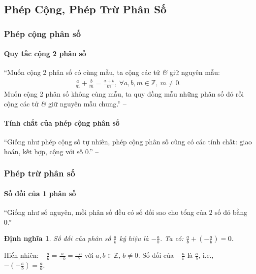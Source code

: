 \documentclass{article}
\numberwithin{equation}{section}
\newtheorem{dinhnghia}{Định nghĩa}[section]
\begin{document}

\subsection{Phép Cộng, Phép Trừ Phân Số}

\subsubsection{Phép cộng phân số}

\paragraph{Quy tắc cộng 2 phân số}
``Muốn cộng 2 phân số có cùng mẫu, ta cộng các tử \textit{\&} giữ nguyên mẫu:
\begin{align*}
	\frac{a}{m} + \frac{b}{m} = \frac{a + b}{m},\ \forall a,b,m\in\mathbb{Z},\ m\ne 0.
\end{align*}
Muốn cộng 2 phân số không cùng mẫu, ta quy đồng mẫu những phân số đó rồi cộng các tử \textit{\&} giữ nguyên mẫu chung.'' -- \cite[pp. 34--35]{SGK_Toan_6_Canh_Dieu_tap_2}

\paragraph{Tính chất của phép cộng phân số}
``Giống như phép cộng số tự nhiên, phép cộng phân số cũng có các tính chất: giao hoán, kết hợp, cộng với số 0.'' -- \cite[pp. 35]{SGK_Toan_6_Canh_Dieu_tap_2}

\subsubsection{Phép trừ phân số}

\paragraph{Số đối của 1 phân số}
``Giống như số nguyên, mỗi phân số đều có số đối sao cho tổng của 2 số đó bằng 0.'' -- \cite[pp. 36]{SGK_Toan_6_Canh_Dieu_tap_2}

\begin{dinhnghia}
	\emph{Số đối} của phân số $\frac{a}{b}$ ký hiệu là $-\frac{a}{b}$. Ta có: $\frac{a}{b} + \left(-\frac{a}{b}\right) = 0$.
\end{dinhnghia}
Hiển nhiên: $-\frac{a}{b} = \frac{a}{-b} = \frac{-a}{b}$ với $a,b\in\mathbb{Z}$, $b\ne 0$. Số đối của $-\frac{a}{b}$ là $\frac{a}{b}$, i.e., $-\left(-\frac{a}{b}\right) = \frac{a}{b}$.
\end{document}

